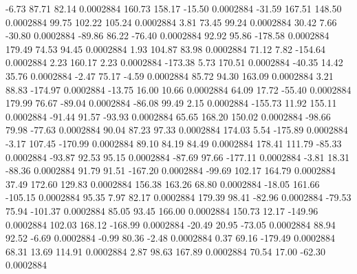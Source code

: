        -6.73       87.71       82.14     0.0002884
      160.73      158.17      -15.50     0.0002884
      -31.59      167.51      148.50     0.0002884
       99.75      102.22      105.24     0.0002884
        3.81       73.45       99.24     0.0002884
       30.42        7.66      -30.80     0.0002884
      -89.86       86.22      -76.40     0.0002884
       92.92       95.86     -178.58     0.0002884
      179.49       74.53       94.45     0.0002884
        1.93      104.87       83.98     0.0002884
       71.12        7.82     -154.64     0.0002884
        2.23      160.17        2.23     0.0002884
     -173.38        5.73      170.51     0.0002884
      -40.35       14.42       35.76     0.0002884
       -2.47       75.17       -4.59     0.0002884
       85.72       94.30      163.09     0.0002884
        3.21       88.83     -174.97     0.0002884
      -13.75       16.00       10.66     0.0002884
       64.09       17.72      -55.40     0.0002884
      179.99       76.67      -89.04     0.0002884
      -86.08       99.49        2.15     0.0002884
     -155.73       11.92      155.11     0.0002884
      -91.44       91.57      -93.93     0.0002884
       65.65      168.20      150.02     0.0002884
      -98.66       79.98      -77.63     0.0002884
       90.04       87.23       97.33     0.0002884
      174.03        5.54     -175.89     0.0002884
       -3.17      107.45     -170.99     0.0002884
       89.10       84.19       84.49     0.0002884
      178.41      111.79      -85.33     0.0002884
      -93.87       92.53       95.15     0.0002884
      -87.69       97.66     -177.11     0.0002884
       -3.81       18.31      -88.36     0.0002884
       91.79       91.51     -167.20     0.0002884
      -99.69      102.17      164.79     0.0002884
       37.49      172.60      129.83     0.0002884
      156.38      163.26       68.80     0.0002884
      -18.05      161.66     -105.15     0.0002884
       95.35        7.97       82.17     0.0002884
      179.39       98.41      -82.96     0.0002884
      -79.53       75.94     -101.37     0.0002884
       85.05       93.45      166.00     0.0002884
      150.73       12.17     -149.96     0.0002884
      102.03      168.12     -168.99     0.0002884
      -20.49       20.95      -73.05     0.0002884
       88.94       92.52       -6.69     0.0002884
       -0.99       80.36       -2.48     0.0002884
        0.37       69.16     -179.49     0.0002884
       68.31       13.69      114.91     0.0002884
        2.87       98.63      167.89     0.0002884
       70.54       17.00      -62.30     0.0002884
